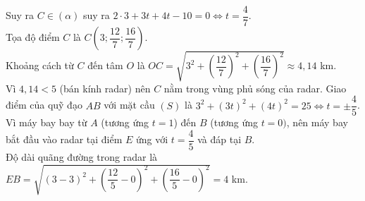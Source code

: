\begin{ex}
{\begin{itemchoice}
			Suy ra $C\in (\alpha)$ suy ra $2\cdot 3 + 3t + 4t - 10 = 0 \Leftrightarrow t = \dfrac{4}{7}$.\\
			Tọa độ điểm $C$ là $C\left(3; \dfrac{12}{7}; \dfrac{16}{7}\right)$.\\
			Khoảng cách từ $C$ đến tâm $O$ là $OC = \sqrt{3^2 + \left(\dfrac{12}{7}\right)^2 + \left(\dfrac{16}{7}\right)^2} \approx 4{,}14$ km. \\
			Vì $4{,}14 < 5$ (bán kính radar) nên $C$ nằm trong vùng phủ sóng của radar.
			\itemch Giao điểm của quỹ đạo $AB$ với mặt cầu $(S)$ là $3^2 + (3t)^2 + (4t)^2 = 25 \Leftrightarrow t = \pm \dfrac{4}{5}$.\\
			Vì máy bay bay từ $A$ (tương ứng $t=1$) đến $B$ (tương ứng $t=0)$, nên máy bay bắt đầu vào radar tại điểm $E$ ứng với $t = \dfrac{4}{5}$ và đáp tại $B$.\\
			Độ dài quãng đường trong radar là $EB = \sqrt{(3-3)^2 + \left(\dfrac{12}{5} - 0\right)^2 + \left(\dfrac{16}{5} - 0\right)^2}= 4$ km.
		\end{itemchoice}
	}
\end{ex}

